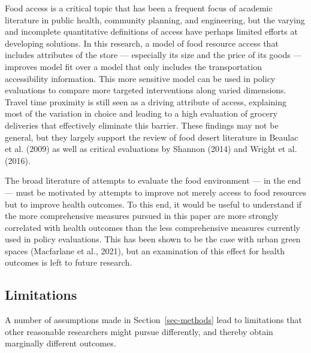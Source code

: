 \documentclass[
  letterpaper,
  number,
  review,
  3p]{elsarticle}
\begin{document}
Food access is a critical topic that has been a frequent focus of
academic literature in public health, community planning, and
engineering, but the varying and incomplete quantitative definitions of
access have perhaps limited efforts at developing solutions. In this
research, a model of food resource access that includes attributes of
the store --- especially its size and the price of its goods ---
improves model fit over a model that only includes the transportation
accessibility information. This more sensitive model can be used in
policy evaluations to compare more targeted interventions along varied
dimensions. Travel time proximity is still seen as a driving attribute
of access, explaining most of the variation in choice and leading to a
high evaluation of grocery deliveries that effectively eliminate this
barrier. These findings may not be general, but they largely support the
review of food desert literature in Beaulac et al. (2009) as well as
critical evaluations by Shannon (2014) and Wright et al. (2016).

The broad literature of attempts to evaluate the food environment --- in
the end --- must be motivated by attempts to improve not merely access
to food resources but to improve health outcomes. To this end, it would
be useful to understand if the more comprehensive measures pursued in
this paper are more strongly correlated with health outcomes than the
less comprehensive measures currently used in policy evaluations. This
has been shown to be the case with urban green spaces (Macfarlane et
al., 2021), but an examination of this effect for health outcomes is
left to future research.

\subsection{Limitations}\label{sec-limitations}

A number of assumptions made in Section~\ref{sec-methods} lead to
limitations that other reasonable researchers might pursue differently,
and thereby obtain marginally different outcomes.
\end{document}

